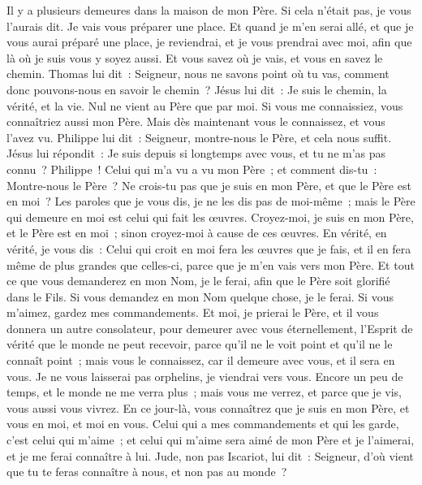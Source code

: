 \begin{multicols}{2}
Il y a plusieurs demeures dans la maison de mon Père. Si cela n'était pas, je vous l'aurais dit. Je vais vous préparer une place.
Et quand je m'en serai allé, et que je vous aurai préparé une place, je reviendrai, et je vous prendrai avec moi, afin que là où je suis vous y soyez aussi.
Et vous savez où je vais, et vous en savez le chemin.
Thomas lui dit~: Seigneur, nous ne savons point où tu vas, comment donc pouvons-nous en savoir le chemin~?
Jésus lui dit~: Je suis le chemin, la vérité, et la vie. Nul ne vient au Père que par moi.
Si vous me connaissiez, vous connaîtriez aussi mon Père. Mais dès maintenant vous le connaissez, et vous l'avez vu.
Philippe lui dit~: Seigneur, montre-nous le Père, et cela nous suffit.
Jésus lui répondit~: Je suis depuis si longtemps avec vous, et tu ne m'as pas connu~? Philippe~! Celui qui m'a vu a vu mon Père~; et comment dis-tu~: Montre-nous le Père~?
Ne crois-tu pas que je suis en mon Père, et que le Père est en moi~? Les paroles que je vous dis, je ne les dis pas de moi-même~; mais le Père qui demeure en moi est celui qui fait les œuvres.
Croyez-moi, je suis en mon Père, et le Père est en moi~; sinon croyez-moi à cause de ces œuvres.
En vérité, en vérité, je vous dis~: Celui qui croit en moi fera les œuvres que je fais, et il en fera même de plus grandes que celles-ci, parce que je m'en vais vers mon Père.
Et tout ce que vous demanderez en mon Nom, je le ferai, afin que le Père soit glorifié dans le Fils.
Si vous demandez en mon Nom quelque chose, je le ferai.
Si vous m'aimez, gardez mes commandements.
Et moi, je prierai le Père, et il vous donnera un autre consolateur, pour demeurer avec vous éternellement,
l'Esprit de vérité que le monde ne peut recevoir, parce qu'il ne le voit point et qu'il ne le connaît point~; mais vous le connaissez, car il demeure avec vous, et il sera en vous.
Je ne vous laisserai pas orphelins, je viendrai vers vous.
Encore un peu de temps, et le monde ne me verra plus~; mais vous me verrez, et parce que je vis, vous aussi vous vivrez.
En ce jour-là, vous connaîtrez que je suis en mon Père, et vous en moi, et moi en vous.
Celui qui a mes commandements et qui les garde, c'est celui qui m'aime~; et celui qui m'aime sera aimé de mon Père et je l'aimerai, et je me ferai connaître à lui.
Jude, non pas Iscariot, lui dit~: Seigneur, d'où vient que tu te feras connaître à nous, et non pas au monde~?

\end{multicols}
